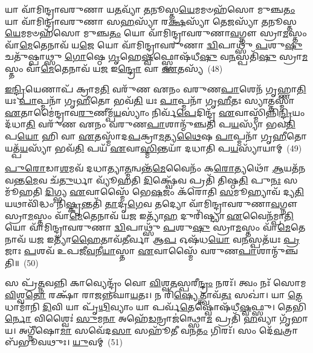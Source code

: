 {\anuvakamend[{\-\ul{𑌮𑍁}\-\-\ul{𑌞𑍍𑌚}\-\-\ul{𑌤𑌿} \ul{𑌚}\-𑌰𑍁𑍞 \ul{𑌸}\-𑌪𑍍𑌤𑌦᳴𑌶 𑌚}]}%

𑌯𑌾 𑌵𑌾᳴𑌮𑌿𑌨𑍍𑌦𑍍𑌰𑌾𑌵𑌰𑍁𑌣𑌾 𑌯\-\ul{𑌤}\-𑌵𑍍𑌯𑌾᳴ \ul{𑌤}\-𑌨𑍂𑌸𑍍𑌤\-\ul{𑌯𑍇}\-𑌮𑌮𑍞𑌹᳴𑌸𑍋 𑌮𑍁𑌞𑍍𑌚\-\ul{𑌤𑌂} 𑌯𑌾 𑌵𑌾᳴𑌮𑌿𑌨𑍍𑌦𑍍𑌰𑌾𑌵𑌰𑍁𑌣𑌾 𑌸\-\ul{𑌹}\-𑌸𑍍𑌯𑌾᳴ 𑌰\-\ul{𑌕𑍍𑌷}\-𑌸𑍍𑌯𑌾᳴ 𑌤𑍇\-\ul{𑌜}\-𑌸𑍍𑌯𑌾᳴ \ul{𑌤}\-𑌨𑍂𑌸𑍍𑌤\-\ul{𑌯𑍇}\-𑌮𑌮𑍞𑌹᳴𑌸𑍋 𑌮𑍁𑌞𑍍𑌚\-\ul{𑌤𑌂} 𑌯𑍋 𑌵𑌾᳴𑌮𑌿𑌨𑍍𑌦𑍍𑌰𑌾𑌵𑌰𑍁𑌣𑌾\-\ul{𑌵}\-𑌗𑍍𑌨𑍗 𑌸𑍍𑌰𑌾\-\ul{𑌮}\-𑌸𑍍𑌤𑌂 𑌵𑌾᳴\-\ul{𑌮𑍇}\-𑌤𑍇𑌨𑌾𑌵᳴ 𑌯\-\ul{𑌜𑍇} 𑌯𑍋 𑌵𑌾᳴𑌮𑌿𑌨𑍍𑌦𑍍𑌰𑌾𑌵𑌰𑍁𑌣𑌾 \ul{𑌦𑍍𑌵𑌿}\-𑌪𑌾𑌥𑍍𑌸𑍁᳴ \ul{𑌪}\-𑌶𑍁\-\ul{𑌷𑍁} 𑌚𑌤𑍁᳴𑌷𑍍𑌪𑌾𑌥𑍍𑌸𑍁 \ul{𑌗𑍋}\-𑌷𑍍𑌠𑍇 \ul{𑌗𑍃}\-𑌹𑍇\-\ul{𑌷𑍍𑌵}\-𑌫𑍍𑌸𑍍𑌵𑍋𑌷᳴𑌧𑍀\-\ul{𑌷𑍁} 𑌵\-\ul{𑌨}\-𑌸𑍍𑌪𑌤𑌿᳴\-\ul{𑌷𑍁} 𑌸𑍍𑌰𑌾\-\ul{𑌮}\-𑌸𑍍𑌤𑌂 𑌵𑌾᳴\-\ul{𑌮𑍇}\-𑌤𑍇𑌨𑌾𑌵᳴ 𑌯\-\ul{𑌜} 𑌇\-\ul{𑌨𑍍𑌦𑍍𑌰𑍋} 𑌵𑌾 \ul{𑌏}\-𑌤𑌸𑍍𑌯᳴~(48)

\-\ul{𑌇}\-\-\ul{𑌨𑍍𑌦𑍍𑌰𑌿}\-𑌯𑍇𑌣𑌾𑌪᳴ 𑌕𑍍𑌰𑌾𑌮\-\ul{𑌤𑌿} 𑌵𑌰𑍁᳴𑌣 𑌏𑌨𑌂 𑌵𑌰𑍁𑌣\-\ul{𑌪𑌾}\-𑌶𑍇𑌨᳴ 𑌗𑍃𑌹𑍍𑌣𑌾\-\ul{𑌤𑌿} 𑌯𑌃 \ul{𑌪𑌾}\-𑌪𑍍𑌮𑌨𑌾᳴ 𑌗𑍃\-\ul{𑌹𑍀}\-𑌤𑍋 𑌭𑌵᳴\-\ul{𑌤𑌿} 𑌯𑌃 \ul{𑌪𑌾}\-𑌪𑍍𑌮𑌨𑌾᳴ 𑌗𑍃\-\ul{𑌹𑍀}\-𑌤𑌃 𑌸𑍍𑌯𑌾𑌤𑍍𑌤𑌸𑍍𑌮𑌾᳴ \ul{𑌏}\-𑌤𑌾𑌮𑍈॑𑌨𑍍𑌦𑍍𑌰𑌾𑌵\-\ul{𑌰𑍁}\-𑌣𑍀𑌮𑍍𑌪᳴\-\ul{𑌯}\-𑌸𑍍𑌯𑌾𑌂॑ 𑌨𑌿𑌰𑍍𑌵᳴\-\ul{𑌪𑍇}\-𑌦𑌿𑌨𑍍𑌦𑍍𑌰᳴ \ul{𑌏}\-𑌵𑌾𑌸𑍍𑌮𑌿᳴𑌨𑍍𑌨𑌿\-\ul{𑌨𑍍𑌦𑍍𑌰𑌿}\-𑌯𑌂 𑌦᳴𑌧𑌾\-\ul{𑌤𑌿} 𑌵𑌰𑍁᳴𑌣 𑌏𑌨𑌂 𑌵𑌰𑍁𑌣\-\ul{𑌪𑌾}\-𑌶𑌾𑌨𑍍𑌮𑍁᳴𑌞𑍍𑌚𑌤𑌿 𑌪\-\ul{𑌯}\-𑌸𑍍𑌯𑌾᳴ 𑌭𑌵\-\ul{𑌤𑌿} 𑌪\-\ul{𑌯𑍋} 𑌹𑌿 𑌵𑌾 \ul{𑌏}\-𑌤𑌸𑍍𑌮𑌾᳴𑌦\-\ul{𑌪}\-𑌕𑍍𑌰𑌾\-\ul{𑌮}\-𑌤𑍍𑌯\-\ul{𑌥𑍈}\-𑌷 \ul{𑌪𑌾}\-𑌪𑍍𑌮𑌨𑌾᳴ 𑌗𑍃\-\ul{𑌹𑍀}\-𑌤𑍋 𑌯𑌤𑍍𑌪᳴\-\ul{𑌯}\-𑌸𑍍𑌯𑌾᳴ 𑌭𑌵᳴\-\ul{𑌤𑌿} 𑌪𑌯᳴ \ul{𑌏}\-𑌵𑌾\-\ul{𑌸𑍍𑌮𑌿}\-𑌨𑍍𑌤𑌯𑌾᳴ 𑌦𑌧𑌾𑌤𑌿 𑌪\-\ul{𑌯}\-𑌸𑍍𑌯𑌾᳴𑌯𑌾𑌮𑍍~(49)

\-\ul{𑌪𑍁}\-\-\ul{𑌰𑍋}\-𑌡𑌾\-\ul{𑌶}\-𑌮𑌵᳴ 𑌦𑌧𑌾𑌤𑍍𑌯𑌾\-\ul{𑌤𑍍𑌮}\-𑌨𑍍𑌵𑌨𑍍𑌤᳴\-\ul{𑌮𑍇}\-𑌵𑍈𑌨𑌂᳴ 𑌕\-\ul{𑌰𑍋}\-𑌤𑍍𑌯𑌥𑍋᳴ \ul{𑌆}\-𑌯𑌤᳴𑌨𑌵𑌨𑍍𑌤\-\ul{𑌮𑍇}\-𑌵 𑌚᳴\-\ul{𑌤𑍁}\-𑌰𑍍𑌧𑌾 𑌵𑍍𑌯𑍂᳴𑌹𑌤𑌿 \ul{𑌦𑌿}\-𑌕𑍍𑌷𑍍𑌵𑍇᳴𑌵 𑌪𑍍𑌰𑌤𑌿᳴ 𑌤𑌿𑌷𑍍𑌠\-\ul{𑌤𑌿} 𑌪𑍁\-\ul{𑌨𑌃} 𑌸𑌮𑍂᳴𑌹𑌤𑌿 \ul{𑌦𑌿}\-𑌗𑍍𑌭𑍍𑌯 \ul{𑌏}\-𑌵𑌾𑌸𑍍𑌮𑍈᳴ 𑌭𑍇\-\ul{𑌷}\-𑌜𑌂 𑌕᳴𑌰𑍋𑌤𑌿 \ul{𑌸}\-𑌮𑍂𑌹𑍍𑌯𑌾𑌵᳴ 𑌦𑍍𑌯\-\ul{𑌤𑌿} 𑌯𑌥𑌾𑌵𑌿᳴𑌦𑍍𑌧𑌂 𑌨𑌿\-\ul{𑌷𑍍𑌕𑍃}\-𑌨𑍍𑌤𑌤𑌿᳴ \ul{𑌤𑌾}\-𑌦𑍃\-\ul{𑌗𑍇}\-𑌵 𑌤𑌦𑍍𑌯𑍋 𑌵𑌾᳴𑌮𑌿𑌨𑍍𑌦𑍍𑌰𑌾𑌵𑌰𑍁𑌣𑌾\-\ul{𑌵}\-𑌗𑍍𑌨𑍗 𑌸𑍍𑌰𑌾\-\ul{𑌮}\-𑌸𑍍𑌤𑌂 𑌵𑌾᳴\-\ul{𑌮𑍇}\-𑌤𑍇𑌨𑌾𑌵᳴ 𑌯\-\ul{𑌜} 𑌇𑌤𑍍𑌯𑌾᳴\-\ul{𑌹} 𑌦𑍁𑌰𑌿᳴𑌷𑍍𑌟𑍍𑌯𑌾 \ul{𑌏}\-𑌵𑍈𑌨᳴𑌮𑍍𑌪𑌾\-\ul{𑌤𑌿} 𑌯𑍋 𑌵𑌾᳴𑌮𑌿𑌨𑍍𑌦𑍍𑌰𑌾𑌵𑌰𑍁𑌣𑌾 \ul{𑌦𑍍𑌵𑌿}\-𑌪𑌾𑌥𑍍𑌸𑍁᳴ \ul{𑌪}\-𑌶𑍁\-\ul{𑌷𑍁} 𑌸𑍍𑌰𑌾\-\ul{𑌮}\-𑌸𑍍𑌤𑌂 𑌵𑌾᳴\-\ul{𑌮𑍇}\-𑌤𑍇𑌨𑌾𑌵᳴ 𑌯\-\ul{𑌜} 𑌇𑌤𑍍𑌯𑌾᳴\-\ul{𑌹𑍈}\-𑌤𑌾𑌵᳴\-\ul{𑌤𑍀}\-𑌰𑍍𑌵𑌾 𑌆\-\ul{𑌪} 𑌓𑌷᳴𑌧\-\ul{𑌯𑍋} 𑌵\-\ul{𑌨}\-𑌸𑍍𑌪𑌤᳴𑌯𑌃 \ul{𑌪𑍍𑌰}\-𑌜𑌾𑌃 \ul{𑌪}\-𑌶𑌵᳴ 𑌉𑌪𑌜𑍀\-\ul{𑌵}\-𑌨𑍀\-\ul{𑌯𑌾}\-𑌸𑍍𑌤𑌾 \ul{𑌏}\-𑌵𑌾𑌸𑍍𑌮𑍈᳴ 𑌵𑌰𑍁𑌣\-\ul{𑌪𑌾}\-𑌶𑌾𑌨𑍍𑌮𑍁᳴𑌞𑍍𑌚𑌤𑌿॥~(50)

{\anuvakamend[{\-\ul{𑌏}\-𑌤𑌸𑍍𑌯᳴ 𑌪\-\ul{𑌯}\-𑌸𑍍𑌯𑌾᳴𑌯𑌾𑌮𑍍𑌪𑌾\-\ul{𑌤𑌿} 𑌷𑌡𑍍𑌵𑌿𑍞᳴𑌶𑌤𑌿𑌶𑍍𑌚}]}%

𑌸 𑌪𑍍𑌰᳴\-\ul{𑌤𑍍𑌨}\-𑌵𑌨𑍍𑌨𑌿 𑌕𑌾𑌵𑍍𑌯𑍇𑌨𑍍𑌦𑍍𑌰𑌂᳴ 𑌵𑍋 \ul{𑌵𑌿}\-𑌶𑍍𑌵\-\ul{𑌤}\-𑌸𑍍𑌪𑌰𑍀\-\ul{𑌨𑍍𑌦𑍍𑌰𑌂} 𑌨𑌰𑌃᳴। 𑌤𑍍𑌵𑌂 𑌨𑌃᳴ 𑌸𑍋𑌮 \ul{𑌵𑌿}\-𑌶𑍍𑌵\-\ul{𑌤𑍋} 𑌰𑌕𑍍𑌷𑌾᳴ 𑌰𑌾𑌜𑌨𑍍𑌨𑌘𑌾\-\ul{𑌯}\-𑌤𑌃। 𑌨 𑌰𑌿᳴\-\ul{𑌷𑍍𑌯𑍇}\-𑌤𑍍𑌤𑍍𑌵𑌾𑌵᳴\-\ul{𑌤𑌃} 𑌸𑌖𑌾॑। 𑌯𑌾 \ul{𑌤𑍇} 𑌧𑌾𑌮𑌾᳴𑌨𑌿 \ul{𑌦𑌿}\-𑌵𑌿 𑌯𑌾 𑌪𑍃᳴\-\ul{𑌥𑌿}\-𑌵𑍍𑌯𑌾𑌂 𑌯𑌾 𑌪𑌰𑍍𑌵᳴\-\ul{𑌤𑍇}\-𑌷𑍍𑌵𑍋𑌷᳴𑌧𑍀\-\ul{𑌷𑍍𑌵}\-𑌫𑍍𑌸𑍁। 𑌤𑍇𑌭𑌿᳴\-\ul{𑌰𑍍𑌨𑍋} 𑌵𑌿𑌶𑍍𑌵𑍈𑌃॑ \ul{𑌸𑍁}\-𑌮\-\ul{𑌨𑌾} 𑌅𑌹𑍇᳴\-\ul{𑌡}\-𑌨𑍍𑌰𑌾𑌜॑𑌨𑍍𑌥𑍍𑌸𑍋\-\ul{𑌮} 𑌪𑍍𑌰𑌤𑌿᳴ \ul{𑌹}\-𑌵𑍍𑌯𑌾 𑌗𑍃᳴𑌭𑌾𑌯। 𑌅𑌗𑍍𑌨𑍀᳴𑌷𑍋\-\ul{𑌮𑌾} 𑌸𑌵𑍇᳴𑌦\-\ul{𑌸𑌾} 𑌸𑌹𑍂᳴𑌤𑍀 𑌵𑌨\-\ul{𑌤𑌂} 𑌗𑌿𑌰𑌃᳴। 𑌸𑌂 𑌦𑍇᳴\-\ul{𑌵}\-𑌤𑍍𑌰𑌾 𑌬᳴𑌭𑍂𑌵𑌥𑍁𑌃। \ul{𑌯𑍁}\-𑌵𑌮𑍍~(51)

